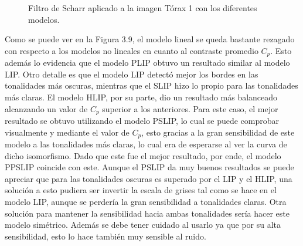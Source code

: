 \begin{figure}
\begin{center}
		\caption{Filtro de Scharr aplicado a la imagen T\'orax 1 con los diferentes modelos.}
	\end{center}
\end{figure} 

Como se puede ver en la Figura 3.9, el modelo lineal se queda bastante rezagado con respecto a los modelos no lineales en cuanto al contraste promedio $C_p$. Esto adem\'as lo evidencia que el modelo PLIP obtuvo un resultado similar al modelo LIP. Otro detalle es que el modelo LIP detect\'o mejor los bordes en las tonalidades m\'as oscuras, mientras que el SLIP hizo lo propio para las tonalidades m\'as claras. El modelo HLIP, por su parte, dio un resultado m\'as balanceado alcanzando un valor de $C_p$ superior a los anteriores. Para este caso, el mejor resultado se obtuvo utilizando el modelo PSLIP, lo cual se puede comprobar visualmente y mediante el valor de $C_p$, esto gracias a la gran sensibilidad de este modelo a las tonalidades m\'as claras, lo cual era de esperarse al ver la curva de dicho isomorfismo. Dado que este fue el mejor resultado, por ende, el modelo PPSLIP coincide con este. Aunque el PSLIP da muy buenos resultados se puede apreciar que para las tonalidades oscuras es superado por el LIP y el HLIP, una soluci\'on a esto pudiera ser invertir la escala de grises tal como se hace en el modelo LIP, aunque se perder\'ia la gran sensibilidad a tonalidades claras. Otra soluci\'on para mantener la sensibilidad hacia ambas tonalidades ser\'ia hacer este modelo sim\'etrico. Adem\'as se debe tener cuidado al usarlo ya que por su alta sensibilidad, esto lo hace tambi\'en muy sensible al ruido.

